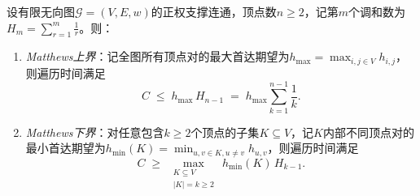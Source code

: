 \begin{theorem}[Matthews定理]
\label{thm:graph-walk-matthews}
设有限无向图$\mathcal G=(V,E,w)$的正权支撑连通，顶点数$n\geq 2$，记第$m$个调和数为$H_m=\sum_{r=1}^m\frac1r$。则：
\begin{enumerate}
\item \emph{Matthews上界}：记全图所有顶点对的最大首达期望为$h_{\max}=\max_{i,j\in V}h_{i,j}$，则遍历时间满足
\begin{equation}
  C \;\leq\; h_{\max}\,H_{n-1} \;=\; h_{\max}\sum_{k=1}^{n-1}\frac{1}{k}.
  \label{eq:graph-walk-matthews-upper}
\end{equation}
\item \emph{Matthews下界}：对任意包含$k\geq 2$个顶点的子集$K\subseteq V$，记$K$内部不同顶点对的最小首达期望为$h_{\min}(K)=\min_{u,v\in K,u\neq v}h_{u,v}$，则遍历时间满足
\begin{equation}
  C \;\geq\; \max_{\substack{K\subseteq V\\|K|=k\geq 2}}\,h_{\min}(K)\,H_{k-1}.
  \label{eq:graph-walk-matthews-lower}
\end{equation}
\end{enumerate}
\end{theorem}

